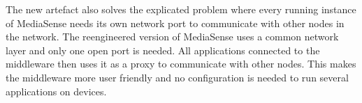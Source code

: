 The new artefact also solves the explicated problem where every running instance of MediaSense needs its own network port to communicate with other nodes in the network. The reengineered version of MediaSense uses a common network layer and only one open port is needed. All applications connected to the middleware then uses it as a proxy to communicate with other nodes. This makes the middleware more user friendly and no configuration is needed to run several applications on devices. 
